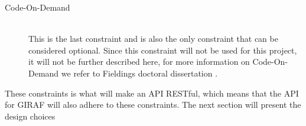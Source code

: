 \begin{description}
\begin{description}
    \end{description}
    \item [Code-On-Demand] \hfill \\
    This is the last constraint and is also the only constraint that can be considered optional.
    Since this constraint will not be used for this project, it will not be further described here, for more information on Code-On-Demand we refer to Fieldings doctoral dissertation \citep{fielding2000rest}.
\end{description}

These constraints is what will make an API RESTful, which means that the API for GIRAF will also adhere to these constraints.
The next section will present the design choices
